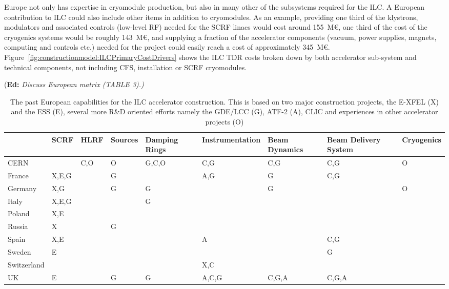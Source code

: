 \documentclass[%
 reprint,
 floatfix,
 amsmath,amssymb,
 aps,
]{revtex4-1}
\newif\ifEdNotes \EdNotestrue
\newcommand{\doednote}[1]{{\color{red}(\textbf{Ed:} \textit{#1)}}}
\newcommand{\ednote}[1]{\ifEdNotes 
  \doednote{#1} 
\fi}
\newcommand\Tstrut{\rule{0pt}{2.9ex}}         %
\begin{document}
Europe not only has expertise in cryomodule production, but also in many other 
of the subsystems required for the ILC. A European contribution to ILC could 
also include other items in addition to cryomodules. As an example, providing 
one third of the klystrons, modulators and associated controls (low-level RF) 
needed for the SCRF linacs would cost around 155~M\euro{}, one third of the cost of 
the cryogenics systems would be roughly 143~M\euro{}, and supplying a fraction of the 
accelerator components (vacuum, power supplies, magnets, computing and controls 
etc.) needed for the project could easily reach a cost of approximately 345~M\euro{}. 
Figure~\ref{fig:constructionmodel:ILCPrimaryCostDrivers} shows the ILC TDR costs broken down by both accelerator sub-system and 
technical components, not including CFS, installation or SCRF cryomodules.

\ednote{Discuss European matrix (TABLE 3).}

\begin{table}

\begin{tabular}{l|C{1.8cm}|C{1.8cm}|C{1.8cm}|C{1.8cm}|C{1.8cm}|C{1.8cm}|C{1.8cm}|C{1.8cm}|}
  	&\bfseries SCRF	& \bfseries HLRF	&\bfseries Sources&\bfseries Damping Rings	&\bfseries Instru\-mentation&\bfseries Beam Dynamics	&\bfseries Beam Delivery System	&\bfseries Cryogenics \\\hline\Tstrut
CERN	&	&C,O	&O	&G,C,O		&C,G		&C,G		&C,G			&O\\
France	&X,E,G	&	&G	&		&A,G		&G		&C,G			&\\
Germany	&X,G	&	&G	&G		&		&G		&			&O\\
Italy	&X,E,G	&	&	&G		&		&		&			&\\
Poland	&X,E	&	&	&		&		&		&			&\\
Russia	&X	&	&G	&		&		&		&			&\\
Spain	&X,E	&	&	&		&A		&		&C,G			&\\
Sweden	&E	&	&	&		&		&		&G			&\\
Switzerland& 	&	&	&		&X,C		&		&			&\\
UK	&E	&	&G	&G		&A,C,G		&C,G,A		&C,G,A			&\\ \hline
\end{tabular}

\caption{The past European capabilities for the ILC accelerator construction. This is based on two major construction projects, the  E-XFEL (X) and the ESS (E),  
several more R\&D oriented efforts namely the GDE/LCC (G), ATF-2 (A), CLIC and  experiences in other accelerator projects (O)}
\end{table}
\end{document}
